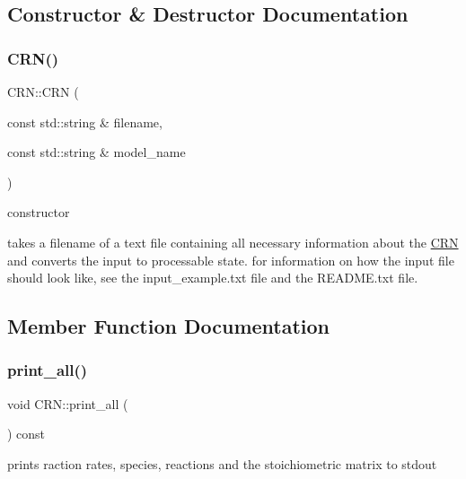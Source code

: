 \subsection{Constructor \& Destructor Documentation}
\mbox{\label{classCRN_acea074d74a2269357d14c6f667649293}} 
\subsubsection{\texorpdfstring{C\+R\+N()}{CRN()}}
{\footnotesize\ttfamily C\+R\+N\+::\+C\+RN (\begin{DoxyParamCaption}\item[{const std\+::string \&}]{filename,  }\item[{const std\+::string \&}]{model\+\_\+name }\end{DoxyParamCaption})}



constructor 

takes a filename of a text file containing all necessary information about the \mbox{\hyperlink{classCRN}{C\+RN}} and converts the input to processable state. for information on how the input file should look like, see the input\+\_\+example.\+txt file and the R\+E\+A\+D\+M\+E.\+txt file. 

\subsection{Member Function Documentation}
\mbox{\label{classCRN_a122e6176bc12186e3d90c6d84cd6ce0c}} 
\subsubsection{\texorpdfstring{print\+\_\+all()}{print\_all()}}
{\footnotesize\ttfamily void C\+R\+N\+::print\+\_\+all (\begin{DoxyParamCaption}{ }\end{DoxyParamCaption}) const}



prints raction rates, species, reactions and the stoichiometric matrix to stdout 

\mbox{\label{classCRN_a793a9a8490b0864d765b4ce87a3e3f35}} 
